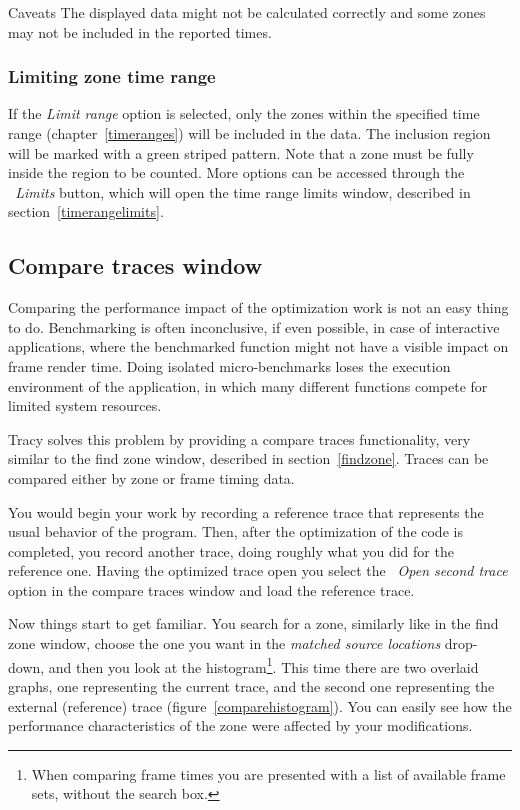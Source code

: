\documentclass[hidelinks,titlepage,a4paper]{article}
\begin{document}
\begin{bclogo}[
noborder=true,
couleur=black!5,
logo=\bcattention
]{Caveats}
The displayed data might not be calculated correctly and some zones may not be included in the reported times.
\end{bclogo}

\subsubsection{Limiting zone time range}

If the \emph{Limit range} option is selected, only the zones within the specified time range (chapter~\ref{timeranges}) will be included in the data. The inclusion region will be marked with a green striped pattern. Note that a zone must be fully inside the region to be counted. More options can be accessed through the \emph{\faRuler{}~Limits} button, which will open the time range limits window, described in section~\ref{timerangelimits}.

\subsection{Compare traces window}
\label{compare}

Comparing the performance impact of the optimization work is not an easy thing to do. Benchmarking is often inconclusive, if even possible, in case of interactive applications, where the benchmarked function might not have a visible impact on frame render time. Doing isolated micro-benchmarks loses the execution environment of the application, in which many different functions compete for limited system resources.

Tracy solves this problem by providing a compare traces functionality, very similar to the find zone window, described in section~\ref{findzone}. Traces can be compared either by zone or frame timing data.

You would begin your work by recording a reference trace that represents the usual behavior of the program. Then, after the optimization of the code is completed, you record another trace, doing roughly what you did for the reference one. Having the optimized trace open you select the \emph{\faFolderOpen{}~Open second trace} option in the compare traces window and load the reference trace.

Now things start to get familiar. You search for a zone, similarly like in the find zone window, choose the one you want in the \emph{matched source locations} drop-down, and then you look at the histogram\footnote{When comparing frame times you are presented with a list of available frame sets, without the search box.}. This time there are two overlaid graphs, one representing the current trace, and the second one representing the external (reference) trace (figure~\ref{comparehistogram}). You can easily see how the performance characteristics of the zone were affected by your modifications.
\end{document}
